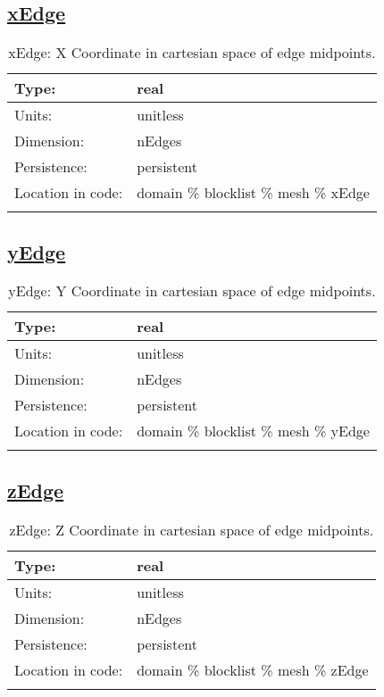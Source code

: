 \subsection[xEdge]{\hyperref[sec:var_tab_mesh]{xEdge}}
\label{subsec:var_sec_mesh_xEdge}
\begin{center}
\begin{longtable}{| p{2.0in} | p{4.0in} |}
        \hline 
        Type: & real \\
        \hline 
        Units: & \si{unitless} \\
        \hline 
        Dimension: & nEdges \\
        \hline 
        Persistence: & persistent \\
        \hline 
         Location in code: & domain \% blocklist \% mesh \% xEdge \\
         \hline 
    \caption{xEdge: X Coordinate in cartesian space of edge midpoints.}
\end{longtable}
\end{center}
\subsection[yEdge]{\hyperref[sec:var_tab_mesh]{yEdge}}
\label{subsec:var_sec_mesh_yEdge}
\begin{center}
\begin{longtable}{| p{2.0in} | p{4.0in} |}
        \hline 
        Type: & real \\
        \hline 
        Units: & \si{unitless} \\
        \hline 
        Dimension: & nEdges \\
        \hline 
        Persistence: & persistent \\
        \hline 
         Location in code: & domain \% blocklist \% mesh \% yEdge \\
         \hline 
    \caption{yEdge: Y Coordinate in cartesian space of edge midpoints.}
\end{longtable}
\end{center}
\subsection[zEdge]{\hyperref[sec:var_tab_mesh]{zEdge}}
\label{subsec:var_sec_mesh_zEdge}
\begin{center}
\begin{longtable}{| p{2.0in} | p{4.0in} |}
        \hline 
        Type: & real \\
        \hline 
        Units: & \si{unitless} \\
        \hline 
        Dimension: & nEdges \\
        \hline 
        Persistence: & persistent \\
        \hline 
         Location in code: & domain \% blocklist \% mesh \% zEdge \\
         \hline 
    \caption{zEdge: Z Coordinate in cartesian space of edge midpoints.}
\end{longtable}
\end{center}
